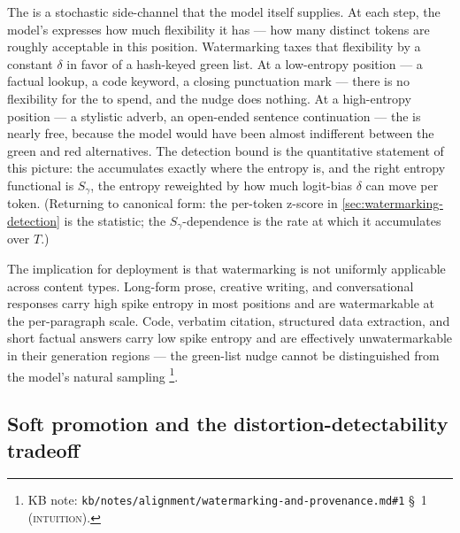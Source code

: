 \begin{intuition}
The  is a stochastic side-channel that the model itself
supplies. At each step, the model's  expresses how much
flexibility it has --- how many distinct tokens are roughly
acceptable in this position. Watermarking taxes that flexibility by a
constant $\delta$ in favor of a hash-keyed green list. At a low-entropy
position --- a factual lookup, a code keyword, a closing punctuation
mark --- there is no flexibility for the  to spend, and the
nudge does nothing. At a high-entropy position --- a stylistic
adverb, an open-ended sentence continuation --- the  is
nearly free, because the model would have been almost indifferent
between the green and red alternatives. The detection bound is the
quantitative statement of this picture: the  accumulates
exactly where the entropy is, and the right entropy functional is
$S_\gamma$, the entropy reweighted by how much logit-bias $\delta$
can move per token. (Returning to canonical form: the per-token
z-score in \cref{sec:watermarking-detection} is the statistic; the
$S_\gamma$-dependence is the rate at which it accumulates over $T$.)
\end{intuition}

The implication for deployment is that watermarking is not uniformly
applicable across content types. Long-form prose, creative writing,
and conversational responses carry high spike entropy in most
positions and are watermarkable at the per-paragraph scale. Code,
verbatim citation, structured data extraction, and short factual
answers carry low spike entropy and are effectively unwatermarkable in
their generation regions --- the green-list nudge cannot be
distinguished from the model's natural sampling%
\footnote{KB note: \texttt{kb/notes/alignment/watermarking-and-provenance.md\#1}
\S~1 (\textsc{intuition}).}.

\subsection{Soft promotion and the distortion-detectability tradeoff}
\label{sec:watermarking-soft}

